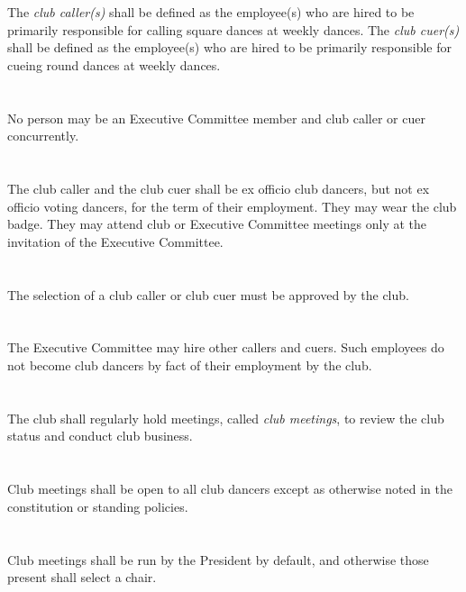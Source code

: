 \documentclass{bylaws}
\begin{document}
\section{}The \textit{club caller(s)} shall be defined as the employee(s) who are hired to be primarily responsible for calling square dances at weekly dances. The \textit{club cuer(s)} shall be defined as the employee(s) who are hired to be primarily responsible for cueing round dances at weekly dances.
\section{}No person may be an Executive Committee member and club caller or cuer concurrently.
\section{}The club caller and the club cuer shall be ex officio club dancers, but not ex officio voting dancers, for the term of their employment. They may wear the club badge. They may attend club or Executive Committee meetings only at the invitation of the Executive Committee.
\section{}The selection of a club caller or club cuer must be approved by the club.
\section{}The Executive Committee may hire other callers and cuers.  Such employees do not become club dancers by fact of their employment by the club.


\section{}The club shall regularly hold meetings, called \textit{club meetings}, to review the club status and conduct club business.
\section{}Club meetings shall be open to all club dancers except as otherwise noted in the constitution or standing policies.
\section{}Club meetings shall be run by the President by default, and otherwise those present shall select a chair.
\end{document}
